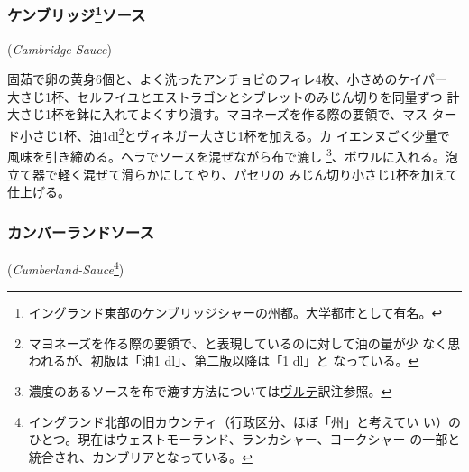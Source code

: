 
\begin{recette}
\hypertarget{cambridge-sauce}{%
\subsubsection[ケンブリッジソース]{\texorpdfstring{ケンブリッジ\footnote{イングランド東部のケンブリッジシャーの州都。大学都市として有名。}ソース}{ケンブリッジソース}}\label{cambridge-sauce}}

\hspace{1em}(\emph{Cambridge-Sauce})


固茹で卵の黄身6個と、よく洗ったアンチョビのフィレ4枚、小さめのケイパー
大さじ1杯、セルフイユとエストラゴンとシブレットのみじん切りを同量ずつ
計大さじ1杯を鉢に入れてよくすり潰す。マヨネーズを作る際の要領で、マス
タード小さじ1杯、油1\undemi{}dl\footnote{マヨネーズを作る際の要領で、と表現しているのに対して油の量が少
  なく思われるが、初版は「油1 dl」、第二版以降は「1\undemi{} dl」と
  なっている。}とヴィネガー大さじ1杯を加える。カ
イエンヌごく少量で風味を引き締める。ヘラでソースを混ぜながら布で漉し
\footnote{濃度のあるソースを布で漉す方法については\protect\hyperlink{veloute}{ヴルテ}訳注参照。}、ボウルに入れる。泡立て器で軽く混ぜて滑らかにしてやり、パセリの
みじん切り小さじ1杯を加えて仕上げる。

\maeaki

\hypertarget{cumberland-sauce}{%
\subsubsection{カンバーランドソース}\label{cumberland-sauce}}

\hspace{1em}(\emph{Cumberland-Sauce}\footnote{イングランド北部の旧カウンティ（行政区分、ほぼ「州」と考えてい
  い）のひとつ。現在はウェストモーランド、ランカシャー、ヨークシャー
  の一部と統合され、カンブリアとなっている。})


\end{recette}

